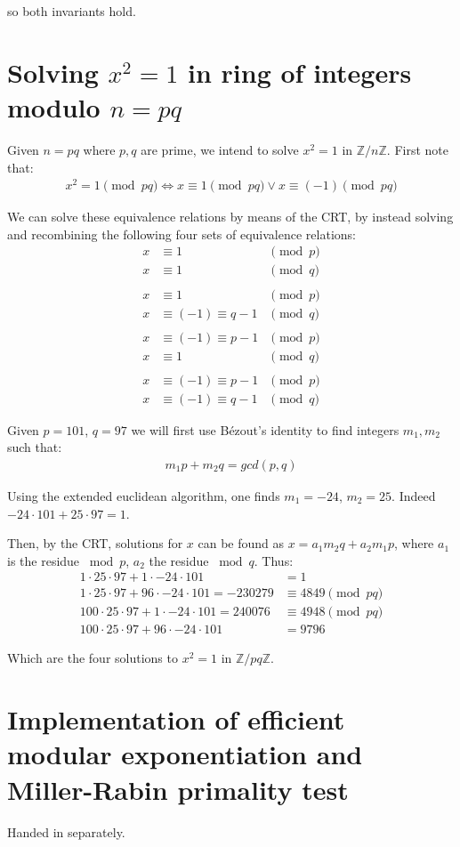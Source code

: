 \documentclass[a4paper]{scrreprt}
\begin{document}
so both invariants hold.

\section{Solving $x^2 = 1$ in ring of integers modulo $n = pq$}

Given $n = pq$ where $p, q$ are prime, we intend to solve $x^2 = 1$ in
$\mathbb{Z} / n\mathbb{Z}$. First note that:
\begin{align*}
		x^2 = 1 \pmod{pq} \Leftrightarrow x \equiv 1 \pmod{pq} \lor x \equiv (-1) \pmod {pq}
\end{align*}

We can solve these equivalence relations by means of the CRT, by instead
solving and recombining the following four sets of equivalence relations:
\begin{align*}
		x & \equiv 1 & \pmod{p} \\
		x & \equiv 1 & \pmod{q} \\
		\\
		x & \equiv 1 & \pmod{p} \\
		x & \equiv (-1) \equiv q-1 & \pmod{q} \\
		\\
		x & \equiv (-1) \equiv p-1 & \pmod{p} \\
		x & \equiv 1 & \pmod{q} \\
		\\
		x & \equiv (-1) \equiv p-1 & \pmod{p} \\
		x & \equiv (-1) \equiv q-1 & \pmod{q}
\end{align*}

Given $p = 101$, $q = 97$ we will first use Bézout's identity to find integers
$m_1, m_2$ such that:
\begin{align*}
		m_1 p + m_2 q = gcd(p, q)
\end{align*}

Using the extended euclidean algorithm, one finds $m_1 = -24$, $m_2 = 25$.
Indeed $-24 \cdot 101 + 25 \cdot 97 = 1$.

Then, by the CRT, solutions for $x$ can be found as $x = a_1 m_2 q + a_2 m_1 p$,
where $a_1$ is the residue $\bmod p$, $a_2$ the residue $\bmod q$. Thus:
\begin{align*}
		1 \cdot 25 \cdot 97 + 1 \cdot -24 \cdot 101 & = 1 \\
		1 \cdot 25 \cdot 97 + 96 \cdot -24 \cdot 101 = -230279 & \equiv 4849 \pmod{pq} \\
		100 \cdot 25 \cdot 97 + 1 \cdot -24 \cdot 101 = 240076 & \equiv 4948 \pmod {pq} \\
		100 \cdot 25 \cdot 97 + 96 \cdot -24 \cdot 101 & = 9796
\end{align*}

Which are the four solutions to $x^2 = 1$ in $\mathbb{Z} / pq \mathbb{Z}$.

\section{Implementation of efficient modular exponentiation and Miller-Rabin primality test}

Handed in separately.

\printbibliography{}
\end{document}
